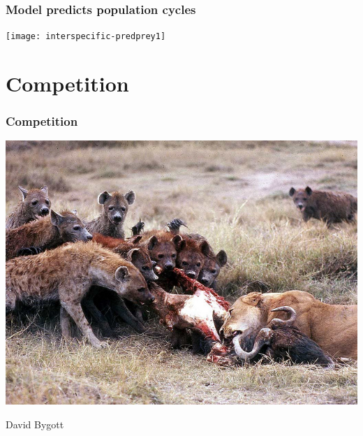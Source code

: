 \documentclass[color=usenames,dvipsnames]{beamer}\usepackage[]{graphicx}\usepackage[]{color}
\begin{document}
\begin{frame}[fragile]
  \frametitle{Model predicts population cycles}
\vspace{-1.2cm}

\begin{center}
  \texttt{[image: interspecific-predprey1]}
\end{center}
\end{frame}






\section{Competition}




\begin{frame}
  \frametitle{Competition}
  \begin{center}
    \includegraphics[width=.95\textwidth]{figs/Hyena_lion} \par
    \vspace{-0.5cm} \hspace{.75\textwidth}
    {\tiny David Bygott \par}
  \end{center}
\end{frame}
\end{document}
